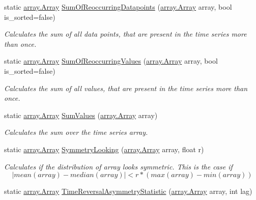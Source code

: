 \begin{DoxyCompactItemize}
static \mbox{\hyperlink{classkhiva_1_1array_1_1_array}{array.\+Array}} \mbox{\hyperlink{classkhiva_1_1features_1_1_features_ad2943eb1b4ed0dff06ffd36b6eb3c858}{Sum\+Of\+Reoccurring\+Datapoints}} (\mbox{\hyperlink{classkhiva_1_1array_1_1_array}{array.\+Array}} array, bool is\+\_\+sorted=false)
\begin{DoxyCompactList}\small\item\em Calculates the sum of all data points, that are present in the time series more than once. \end{DoxyCompactList}\item 
static \mbox{\hyperlink{classkhiva_1_1array_1_1_array}{array.\+Array}} \mbox{\hyperlink{classkhiva_1_1features_1_1_features_afd4ed289029b84b26a55b7e3f358fd43}{Sum\+Of\+Reoccurring\+Values}} (\mbox{\hyperlink{classkhiva_1_1array_1_1_array}{array.\+Array}} array, bool is\+\_\+sorted=false)
\begin{DoxyCompactList}\small\item\em Calculates the sum of all values, that are present in the time series more than once. \end{DoxyCompactList}\item 
static \mbox{\hyperlink{classkhiva_1_1array_1_1_array}{array.\+Array}} \mbox{\hyperlink{classkhiva_1_1features_1_1_features_a4ff27da1f1df300039a060ae5495383b}{Sum\+Values}} (\mbox{\hyperlink{classkhiva_1_1array_1_1_array}{array.\+Array}} array)
\begin{DoxyCompactList}\small\item\em Calculates the sum over the time series array. \end{DoxyCompactList}\item 
static \mbox{\hyperlink{classkhiva_1_1array_1_1_array}{array.\+Array}} \mbox{\hyperlink{classkhiva_1_1features_1_1_features_aee05d0d4a8c61a95f8080a0ee9040739}{Symmetry\+Looking}} (\mbox{\hyperlink{classkhiva_1_1array_1_1_array}{array.\+Array}} array, float r)
\begin{DoxyCompactList}\small\item\em Calculates if the distribution of array {\itshape looks symmetric}. This is the case if \[ | mean(array) - median(array) | \lt r * (max(array) - min(array)) \] \end{DoxyCompactList}\item 
static \mbox{\hyperlink{classkhiva_1_1array_1_1_array}{array.\+Array}} \mbox{\hyperlink{classkhiva_1_1features_1_1_features_afee3c3d5d23ffc2085e9cdeb369e8bf6}{Time\+Reversal\+Asymmetry\+Statistic}} (\mbox{\hyperlink{classkhiva_1_1array_1_1_array}{array.\+Array}} array, int lag)

\end{DoxyCompactItemize}
